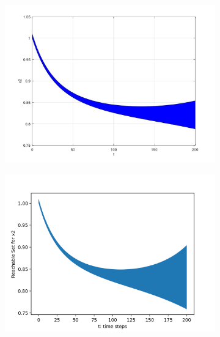 \documentclass[EPiC]{easychair}
\begin{document}
\begin{figure}[h]
    \begin{subfigure}{0.5\textwidth}
    \centering
    \includegraphics[width=\textwidth]{SapoFigures/Phos/SapoPhos_X2.jpg}
    \end{subfigure}
    \begin{subfigure}{0.6\textwidth}
    \centering
    \includegraphics[width=\textwidth]{SapoFigures/Phos/KaaPhos_X2.png}
    \end{subfigure}
    

\end{figure}
\end{document}
